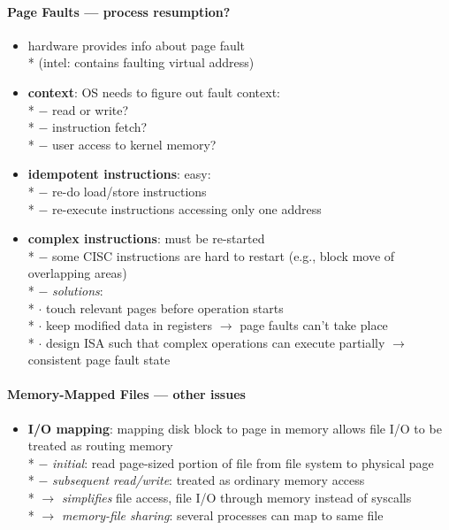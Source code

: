 \paragraph{Page Faults --- process resumption?}
\begin{itemize}
  \item hardware provides info about page fault \\*
    (intel:  contains faulting virtual address)
  \item \textbf{context}: OS needs to figure out fault context: \\*
    $ - $ read or write? \\*
    $ - $ instruction fetch? \\*
    $ - $ user access to kernel memory?
  \item \textbf{idempotent instructions}: easy: \\*
    $ - $ re-do load/store instructions \\*
    $ - $ re-execute instructions accessing only one address
  \item \textbf{complex instructions}: must be re-started \\*
    $ - $ some CISC instructions are hard to restart (e.g., block move of overlapping areas) \\*
    $ - $ \emph{solutions}: \\*
      \phantom{$ - $} $ \cdot $ touch relevant pages before operation starts \\*
      \phantom{$ - $} $ \cdot $ keep modified data in registers $ \to $ page faults can't take place \\*
      \phantom{$ - $} $ \cdot $ design ISA such that complex operations can execute partially $ \to $ consistent page fault state
\end{itemize}

\paragraph{Memory-Mapped Files --- other issues}
\begin{itemize}
  \item \textbf{I/O mapping}: mapping disk block to page in memory allows file I/O to be treated as routing memory  \\*
    $ - $ \emph{initial}: read page-sized portion of file from file system to physical page \\*
    $ - $ \emph{subsequent read/write}: treated as ordinary memory access \\*
    $ \to $ \emph{simplifies} file access, file I/O through memory instead of syscalls \\*
    $ \to $ \emph{memory-file sharing}: several processes can map to same file
\end{itemize}

